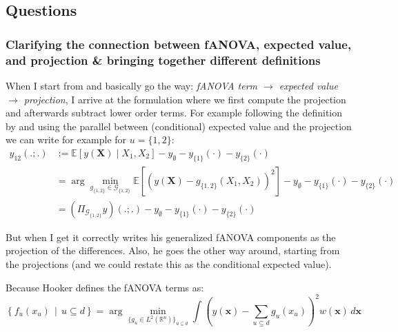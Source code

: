 
\subsection*{Questions}
\subsubsection*{Clarifying the connection between fANOVA, expected value, and projection \& bringing together different definitions}
When I start from \cite{muehlenstaedt2012} and basically go the way: \textit{fANOVA term $\rightarrow$ expected value $\rightarrow$ projection}, I arrive at the formulation where we first compute the projection and afterwards subtract lower order terms. For example following the definition by \cite{muehlenstaedt2012} and using the parallel between (conditional) expected value and the projection \citep{vanravenzwaaij2018} we can write for example for $u = \{1,2\}$:
\begin{align*}
    y_{12}(.;.) &:= \mathbb{E}[y(\boldsymbol{X}) \mid X_1, X_2] - y_\emptyset - y_{\{1\}}(\cdot) - y_{\{2\}}(\cdot) \\
    &= \arg\min_{g_{\{1,2\}} \in \mathcal{G}_{\{1,2\}}} \mathbb{E}\left[(y(\boldsymbol{X}) - g_{\{1,2\}}(X_1, X_2))^2\right] - y_\emptyset - y_{\{1\}}(\cdot) - y_{\{2\}}(\cdot) \\
    &= (\Pi_{\mathcal{G}_{\{1,2\}}}y)(.;.) - y_\emptyset - y_{\{1\}}(\cdot) - y_{\{2\}}(\cdot)
\end{align*}

But when I get it correctly \cite{hooker2007} writes his generalized fANOVA components as the projection of the differences. Also, he goes the other way around, starting from the projections (and we could restate this as the conditional expected value).

Because Hooker defines the fANOVA terms as:
\begin{equation}
\left\{ f_u(x_u) \,\middle|\, u \subseteq d \right\}
= \arg\min_{\{g_u \in L^2(\mathbb{R}^u)\}_{u \subseteq d}} 
\int \left( y(\boldsymbol{x}) - \sum_{u \subseteq d} g_u(x_u) \right)^2 w(\boldsymbol{x}) \, d\boldsymbol{x}
\label{eq:fanova_decomposition_generalized}
\end{equation}

